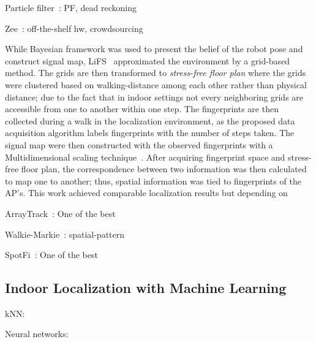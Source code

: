 \documentclass[letterpaper, 10 pt, conference]{ieeeconf}  %
\newcommand{\lorem}{
}
\begin{document}

    Particle filter~\cite{biswas2010wifi}: PF, dead reckoning

    Zee~\cite{rai2012zee}: off-the-shelf hw, crowdsourcing

    While Bayesian framework was used to present the belief of the robot pose and construct signal map, LiFS~\cite{yang2012locating} approximated the environment by a grid-based method.
    The grids are then transformed to \textit{stress-free floor plan} where the grids were clustered based on walking-distance among each other rather than physical distance; due to the fact that in indoor settings not every neighboring grids are accessible from one to another within one step.
    The fingerprints are then collected during a walk in the localization environment, as the proposed data acquisition algorithm labels fingerprints with the number of steps taken.
    The signal map were then constructed with the observed fingerprints with a Multidimensional scaling technique~\cite{borg2005modern}.
    After acquiring fingerprint space and stress-free floor plan, the correspondence between two information was then calculated to map one to another; thus, spatial information was tied to fingerprints of the AP's.
    This work achieved comparable localization results but depending on

    ArrayTrack~\cite{xiong2013arraytrack}: One of the best
    \lorem{}

    Walkie-Markie~\cite{shen2013walkie}: spatial-pattern
    \lorem{}

    SpotFi~\cite{kotaru2015spotfi}: One of the best
    \lorem{}


  \subsection{Indoor Localization with Machine Learning}
    kNN:~\cite{liu2007survey}
    \lorem{}


    Neural networks:~\cite{dayekh2010cooperative}
    \lorem{}
\end{document}
